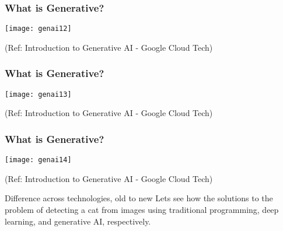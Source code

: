 \begin{frame}[fragile]\frametitle{What is Generative?}

\begin{center}
\texttt{[image: genai12]}
\end{center}

{\tiny (Ref: Introduction to Generative AI - Google Cloud Tech)}

\end{frame}

\begin{frame}[fragile]\frametitle{What is Generative?}

\begin{center}
\texttt{[image: genai13]}
\end{center}


{\tiny (Ref: Introduction to Generative AI - Google Cloud Tech)}

\end{frame}

\begin{frame}[fragile]\frametitle{What is Generative?}

\begin{center}
\texttt{[image: genai14]}
\end{center}


{\tiny (Ref: Introduction to Generative AI - Google Cloud Tech)}

\end{frame}

\begin{frame}[fragile]{Difference across technologies, old to new}
Lets see how the solutions to the problem of detecting a cat from images using traditional programming, deep learning, and generative AI, respectively.
\end{frame}

